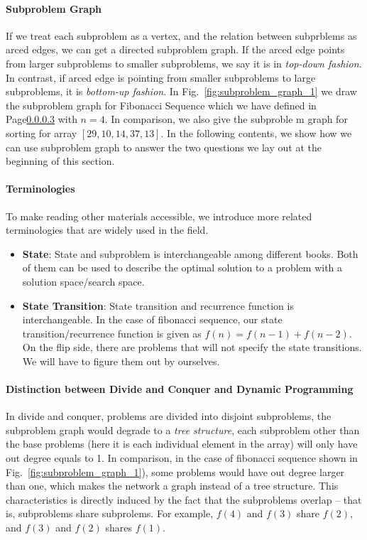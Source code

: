 \documentclass[../main.tex]{subfiles}
\begin{document}
\paragraph{Subproblem Graph} If we treat each subproblem as a vertex, and the relation between subprblems as arced edges, we can get a directed subproblem graph. If the arced edge points from larger subproblems to smaller subproblems, we say it is in \textit{top-down fashion}. In contrast, if arced edge is pointing from smaller subproblems to large subproblems, it is \textit{bottom-up fashion}. In Fig.~\ref{fig:subproblem_graph_1} we draw the subproblem graph for Fibonacci Sequence which we have defined in Page\ref{} with $n=4$. In comparison, we also give the subproble m graph for sorting for array $[29, 10, 14, 37, 13]$. In the following contents, we show how we can use subproblem graph to answer the two questions we lay out at the beginning of this section. 
\paragraph{Terminologies} To make reading other materials accessible, we introduce more related terminologies that are widely used in the field.
\begin{itemize}
    \item \textbf{State}: State and subproblem is interchangeable among different books. Both of them can be used to describe the optimal solution to a problem with a solution space/search space. 
    \item \textbf{State Transition}: State transition and recurrence function is interchangeable. In the case of fibonacci sequence, our state transition/recurrence function is given as $f(n)=f(n-1)+f(n-2)$.  On the flip side, there are problems that will not specify the state transitions. We will have to figure them out by ourselves.
\end{itemize}

\paragraph{Distinction between Divide and Conquer and Dynamic Programming} In divide and conquer, problems are divided into disjoint subproblems, the subproblem graph would degrade to a \textit{tree structure}, each subproblem other than the base problems (here it is each individual element in the array) will only have out degree equals to 1. In comparison, in the case of fibonacci sequence shown in Fig.~\ref{fig:subproblem_graph_1}), some problems would have out degree larger than one, which makes the network a graph instead of a tree structure. This characteristics is directly induced by the fact that the subproblems overlap -- that is, subproblems share subprolems. For example, $f(4)$ and $f(3)$ share $f(2)$, and $f(3)$ and $f(2)$ shares $f(1)$. 
\end{document}
